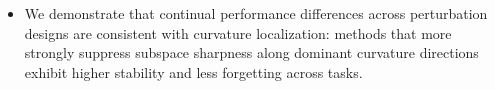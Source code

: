 \documentclass{article}
\theoremstyle{plain}
\theoremstyle{definition}
\theoremstyle{remark}
\begin{document}
\begin{itemize}


\vspace{-4pt}
\item
We demonstrate that continual performance differences across perturbation designs are consistent with curvature localization: methods that more strongly suppress subspace sharpness along dominant curvature directions exhibit higher stability and less forgetting across tasks.


\end{itemize}
\end{document}
